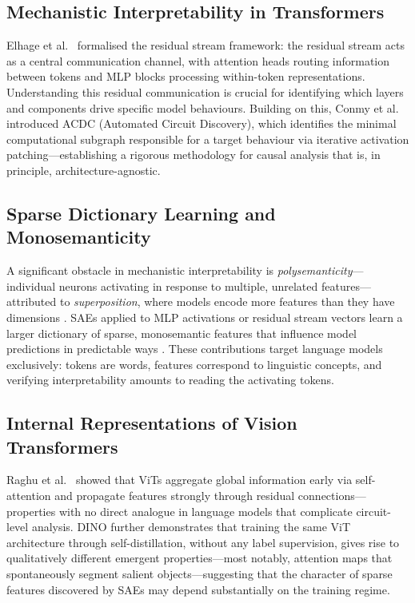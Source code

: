 \subsection{Mechanistic Interpretability in Transformers}
Elhage et al.\ \cite{Elhage2021} formalised the residual stream framework: the residual stream acts as a central communication channel, with attention heads routing information between tokens and MLP blocks processing within-token representations. Understanding this residual communication is crucial for identifying which layers and components drive specific model behaviours. Building on this, Conmy et al.\ \cite{Conmy2023} introduced ACDC (Automated Circuit Discovery), which identifies the minimal computational subgraph responsible for a target behaviour via iterative activation patching---establishing a rigorous methodology for causal analysis that is, in principle, architecture-agnostic.

\subsection{Sparse Dictionary Learning and Monosemanticity}
A significant obstacle in mechanistic interpretability is \textit{polysemanticity}---individual neurons activating in response to multiple, unrelated features---attributed to \textit{superposition}, where models encode more features than they have dimensions \cite{Elhage2021}. SAEs applied to MLP activations or residual stream vectors learn a larger dictionary of sparse, monosemantic features that influence model predictions in predictable ways \cite{Cunningham2024, Bricken2023}. These contributions target language models exclusively: tokens are words, features correspond to linguistic concepts, and verifying interpretability amounts to reading the activating tokens.

\subsection{Internal Representations of Vision Transformers}
Raghu et al.\ \cite{Raghu2021} showed that ViTs aggregate global information early via self-attention and propagate features strongly through residual connections---properties with no direct analogue in language models that complicate circuit-level analysis. DINO \cite{Caron2021} further demonstrates that training the same ViT architecture through self-distillation, without any label supervision, gives rise to qualitatively different emergent properties---most notably, attention maps that spontaneously segment salient objects---suggesting that the character of sparse features discovered by SAEs may depend substantially on the training regime.

